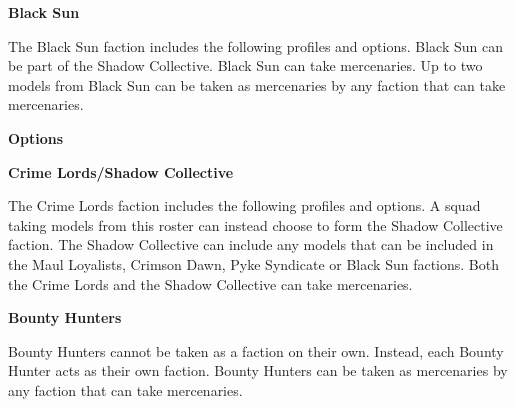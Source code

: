 \documentclass{article}
\begin{document}
\newpage

{\Large \textbf{Black Sun}}
\vspace{0.3cm}

\begin{minipage}{19cm}
    The Black Sun faction includes the following profiles and options.
    Black Sun can be part of the Shadow Collective.
    Black Sun can take mercenaries.
    Up to two models from Black Sun can be taken as mercenaries
    by any faction that can take mercenaries.
\end{minipage}

\vspace{0.3cm}
{\scriptsize
\setlength\extrarowheight{1.5pt}

}
\vspace{0.6cm}

{\large \textbf{Options}}
\vspace{0.3cm}
\begin{multicols}{2}
    {\scriptsize

    \setlength\extrarowheight{1.5pt}
    

    }
\end{multicols}

\vspace{0.6cm}

{\Large \textbf{Crime Lords/Shadow Collective}}
\vspace{0.3cm}

\begin{minipage}{19cm}
    The Crime Lords faction includes the following profiles and options.
    A squad taking models from this roster can instead choose to form the
    Shadow Collective faction. 
    The Shadow Collective can include any models that can be included 
    in the Maul Loyalists, Crimson Dawn, Pyke Syndicate or Black Sun factions.
    Both the Crime Lords and the Shadow Collective can take mercenaries.

\end{minipage}

\vspace{0.3cm}
{\scriptsize
\setlength\extrarowheight{1.5pt}

}

\vspace{0.6cm}

{\Large \textbf{Bounty Hunters}}
\vspace{0.3cm}

\begin{minipage}{19cm}
    Bounty Hunters cannot be taken as a faction on their own.
    Instead, each Bounty Hunter acts as their own faction.
    Bounty Hunters can be taken as mercenaries
    by any faction that can take mercenaries.
\end{minipage}
\end{document}
